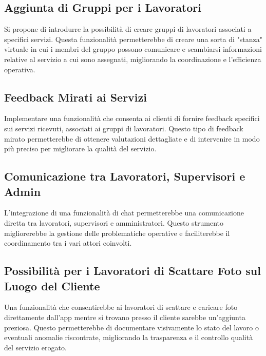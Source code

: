 \documentclass[twoside]{supsistudent}
\begin{document}
\subsection{Aggiunta di Gruppi per i Lavoratori}

Si propone di introdurre la possibilità di creare gruppi di lavoratori associati a specifici servizi. Questa funzionalità permetterebbe di creare una sorta di "stanza" virtuale in cui i membri del gruppo possono comunicare e scambiarsi informazioni relative al servizio a cui sono assegnati, migliorando la coordinazione e l'efficienza operativa.

\subsection{Feedback Mirati ai Servizi}

Implementare una funzionalità che consenta ai clienti di fornire feedback specifici sui servizi ricevuti, associati ai gruppi di lavoratori. Questo tipo di feedback mirato permetterebbe di ottenere valutazioni dettagliate e di intervenire in modo più preciso per migliorare la qualità del servizio.

\subsection{Comunicazione tra Lavoratori, Supervisori e Admin}

L'integrazione di una funzionalità di chat permetterebbe una comunicazione diretta tra lavoratori, supervisori e amministratori. Questo strumento migliorerebbe la gestione delle problematiche operative e faciliterebbe il coordinamento tra i vari attori coinvolti.

\subsection{Possibilità per i Lavoratori di Scattare Foto sul Luogo del Cliente}

Una funzionalità che consentirebbe ai lavoratori di scattare e caricare foto direttamente dall'app mentre si trovano presso il cliente sarebbe un'aggiunta preziosa. Questo permetterebbe di documentare visivamente lo stato del lavoro o eventuali anomalie riscontrate, migliorando la trasparenza e il controllo qualità del servizio erogato.


\cite{4538384}


\end{document}
